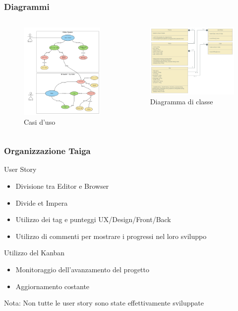 \documentclass{beamer}
\begin{document}
\begin{frame}
\frametitle{Diagrammi}
\begin{columns}
	\centering 
	\begin{figure}[h]
	\includegraphics[width=5cm]{Images/UML/UML4.png}
	\vfill
	\caption{Casi d'uso}
	\end{figure}
	
	\vspace{0.8cm}
	\centering 
	\begin{figure}[h]
	\includegraphics[width=5.5cm]{Images/diagramma_di_classe2.png}
	\caption{Diagramma di classe}
	\end{figure}
\end{columns}
\end{frame}

\begin{frame}
\frametitle{Organizzazione Taiga}
User Story
  \begin{itemize}
  	\item Divisione tra Editor e Browser
	\item Divide et Impera
	\item Utilizzo dei tag e punteggi UX/Design/Front/Back
	\item Utilizzo di commenti per mostrare i progressi nel loro sviluppo
  \end{itemize}
\vspace{5mm}
  Utilizzo del Kanban
    \begin{itemize}
	\item Monitoraggio dell'avanzamento del progetto
	\item Aggiornamento costante
  \end{itemize}
  \vspace{5mm}
  Nota: Non tutte le user story sono state effettivamente sviluppate
\end{frame}
\end{document}
